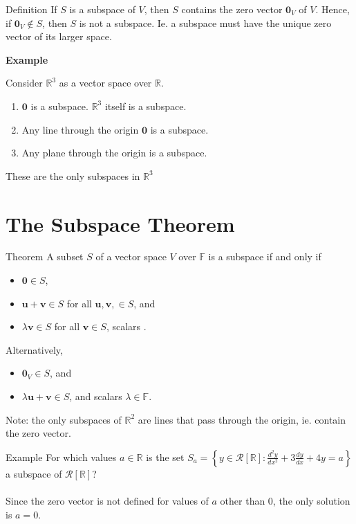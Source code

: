 \documentclass{report}
\renewcommand{\vec}{\mathbf}
\begin{document}
\begin{enumerate}
\begin{question}{Definition}
		If $S$ is a subspace of $V$, then $S$ contains the zero vector $\vec{0}_V$ of $V$. Hence, if $\vec{0}_V \notin S$, then $S$ is not a subspace. Ie. a subspace must have the unique zero vector of its larger space.
	\end{question}

	\textbf{Example}
		
		Consider $\mathbb{R}^3$ as a vector space over $\mathbb{R}$.

		\begin{enumerate}
			\item ${\vec{0}}$ is a subspace. $\mathbb{R}^3$ itself is a subspace.
			\item Any line through the origin $\vec{0}$ is a subspace.
			\item Any plane through the origin is a subspace.
		\end{enumerate}

		These are the only subspaces in $\mathbb{R}^3$
		

	\section{The Subspace Theorem}
	\begin{question}{Theorem}
		A subset $S$ of a vector space $V$ over $\mathbb{F}$ is a subspace if and only if

		\begin{itemize}
			\item $\vec{0} \in S$,
			\item $\vec{u} + \vec{v} \in S$ for all $\vec{u}, \vec{v}, \in S$, and
			\item $\lambda \vec{v} \in S$ for all $\vec{v} \in S$, scalars \lambda \in {}.
		\end{itemize}

		Alternatively,

		\begin{itemize}
			\item $\vec{0}_V \in S$, and
			\item $\lambda \vec{u} + \vec{v} \in S$, and scalars $\lambda \in \mathbb{F}$.
		\end{itemize}
	\end{question}

	Note: the only subspaces of $\mathbb{R}^2$ are lines that pass through the origin, ie. contain the zero vector.

	\begin{question}{Example}
		For which values $a \in \mathbb{R}$ is the set $S_a = \left\{y \in \mathcal{R}[\mathbb{R}] : \frac{d^2y}{dx^2} + 3 \frac{dy}{dx} + 4y = a\right\}$ a subspace of $\mathcal{R}[\mathbb{R}] $?
		\\ \\
		Since the zero vector is not defined for values of $a$ other than 0, the only solution is $a = 0$.
	\end{question}


\end{enumerate}
\end{document}
